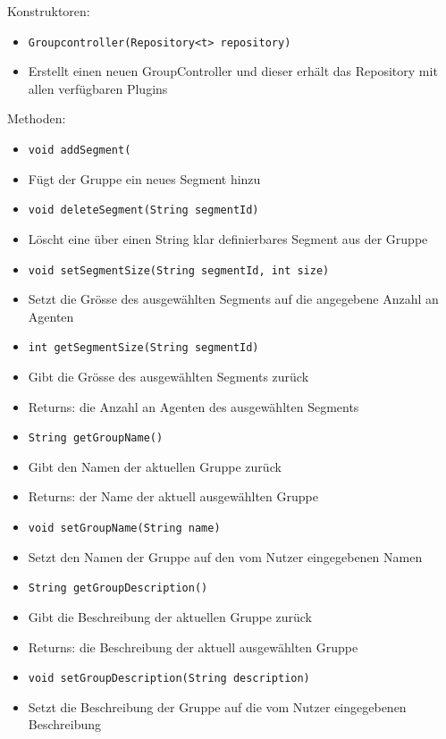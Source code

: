 \documentclass[parskip=full,11pt]{scrartcl}
\begin{document}
Konstruktoren:
\begin{itemize}\itemsep -10pt
\item \texttt{Groupcontroller(Repository<t> repository)}
\item[] Erstellt einen neuen GroupController und dieser erhält das Repository mit allen verfügbaren Plugins
\end{itemize}

Methoden:
\begin{itemize}\itemsep -10pt
\item \texttt{void addSegment(}
\item[] Fügt der Gruppe ein neues Segment hinzu

\item \texttt{void deleteSegment(String segmentId)}
\item[] Löscht eine über einen String klar definierbares Segment aus der Gruppe

\item \texttt{void setSegmentSize(String segmentId, int size)}
\item[] Setzt die Grösse des ausgewählten Segments auf die angegebene Anzahl an Agenten

\item \texttt{int getSegmentSize(String segmentId)}
\item[] Gibt die Grösse des ausgewählten Segments zurück
\item[] Returns: die Anzahl an Agenten des ausgewählten Segments

\item \texttt{String getGroupName()}
\item[] Gibt den Namen der aktuellen Gruppe zurück
\item[] Returns: der Name der aktuell ausgewählten Gruppe

\item \texttt{void setGroupName(String name)}
\item[] Setzt den Namen der Gruppe auf den vom Nutzer eingegebenen Namen

\item \texttt{String getGroupDescription()}
\item[] Gibt die Beschreibung der aktuellen Gruppe zurück
\item[] Returns: die Beschreibung der aktuell ausgewählten Gruppe

\item \texttt{void setGroupDescription(String description)}
\item[] Setzt die Beschreibung der Gruppe auf die vom Nutzer eingegebenen Beschreibung

\end{itemize}
\end{document}
